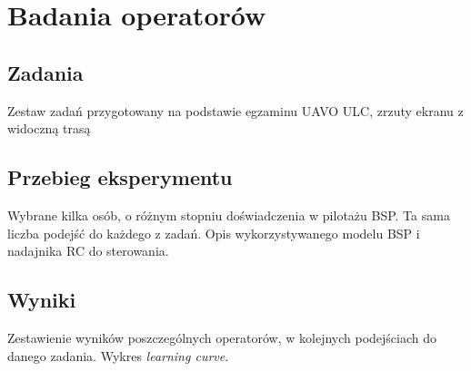 \newpage
\section{Badania operatorów}

\subsection{Zadania}
\begin{todo}
    Zestaw zadań przygotowany na podstawie egzaminu UAVO ULC, zrzuty ekranu z widoczną trasą
\end{todo}

\subsection{Przebieg eksperymentu}
\begin{todo}
    Wybrane kilka osób, o różnym stopniu doświadczenia w pilotażu BSP. Ta sama liczba podejść do każdego z zadań. Opis wykorzystywanego modelu BSP i nadajnika RC do sterowania.
\end{todo}

\subsection{Wyniki}
\begin{todo}
    Zestawienie wyników poszczególnych operatorów, w kolejnych podejściach do danego zadania. Wykres \emph{learning curve}.
\end{todo}
